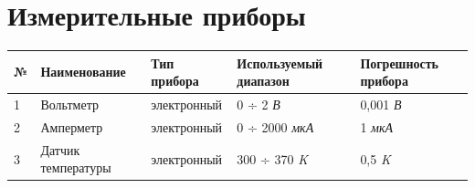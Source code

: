 \section{Измерительные приборы}
\begin{center}
\begin{tabular}{ | m{} | m{4cm}| m{} | m{} | m{} | } 
  \hline
  № & Наименование & Тип прибора & Используемый диапазон & Погрешность прибора \\ 
  \hline
  1 &Вольтметр & электронный & 0 ÷ 2 \textit{В}& 0,001 \textit{В} \\ 
  \hline
   2 &Амперметр & электронный & 0 ÷ 2000 \textit{мкА} & 1 \textit{мкА}\\ 
  \hline
  3 &Датчик температуры & электронный & 300 ÷ 370 \textit{K} & 0,5 \textit{K}\\ 
  \hline
\end{tabular}
\end{center}

